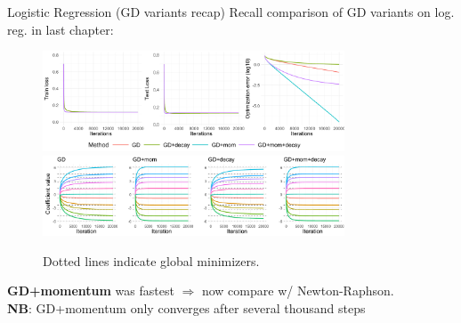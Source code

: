 \documentclass[11pt,compress,t,notes=noshow, xcolor=table]{beamer}
\begin{document}
\begin{vbframe}{Logistic Regression (GD variants recap)}
\vspace{-0.3cm}
Recall comparison of GD variants on log. reg. in last chapter:
\begin{figure}
            \includegraphics[width=0.8\textwidth]{figure_man/GD_log_med_lr_iters.pdf} \\
             \includegraphics[width=0.8\textwidth]{figure_man/GD_log_coef_med.pdf}\\
            \begin{footnotesize}
            Dotted lines indicate global minimizers.
            \end{footnotesize}
\end{figure}
\vspace{-0.2cm}
\textbf{GD+momentum} was fastest $\Rightarrow$ now compare w/ Newton-Raphson.\\
\textbf{NB}: GD+momentum only converges after several thousand steps
\end{vbframe}
\end{document}
